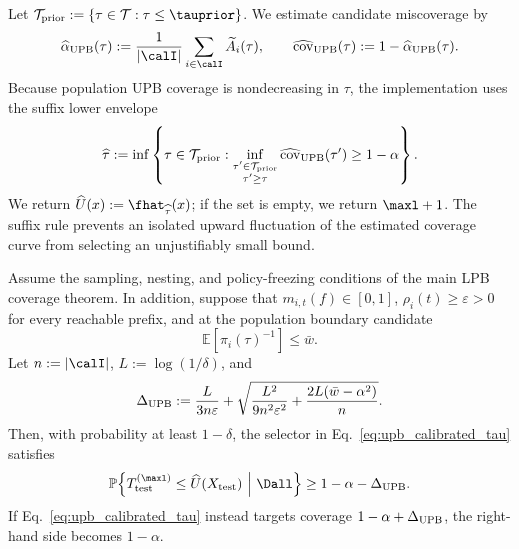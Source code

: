 Let \(\mathcal T_{\rm prior}:=\{\tau\in\mathcal T:\tau\leq\tauprior\}\).
We estimate candidate miscoverage by
\begin{equation}
    \widehat\alpha_{\rm UPB}(\tau)
    :=\frac{1}{|\calI|}\sum_{i\in\calI}\widetilde A_i(\tau),
    \qquad
    \widehat{\operatorname{cov}}_{\rm UPB}(\tau)
    :=1-\widehat\alpha_{\rm UPB}(\tau).
    \label{eq:upb_miscoverage_estimator}
\end{equation}
Because population UPB coverage is nondecreasing in \(\tau\), the
implementation uses the suffix lower envelope
\begin{equation}
    \widehat\tau
    :=\inf\left\{
        \tau\in\mathcal T_{\rm prior}:
        \inf_{\substack{\tau'\in\mathcal T_{\rm prior}\\\tau'\geq\tau}}
        \widehat{\operatorname{cov}}_{\rm UPB}(\tau')
        \geq1-\alpha
    \right\}.
    \label{eq:upb_calibrated_tau}
\end{equation}
We return \(\widehat U(x):=\fhat_{\widehat\tau}(x)\); if the set is empty,
we return \(\maxl+1\). The suffix rule prevents an isolated upward
fluctuation of the estimated coverage curve from selecting an unjustifiably
small bound.

\begin{theorem}
\label{thm:upb_coverage}
Assume the sampling, nesting, and policy-freezing conditions of the main LPB
coverage theorem. In addition, suppose that \(m_{i,t}(f)\in[0,1]\),
\(\rho_i(t)\geq\varepsilon>0\) for every reachable prefix, and at the
population boundary candidate
\begin{equation}
    \mathbb E\!\left[\pi_i(\tau)^{-1}\right]\leq\bar w.
\end{equation}
Let \(n:=|\calI|\), \(L:=\log(1/\delta)\), and
\begin{equation}
    \Delta_{\rm UPB}
    :=\frac{L}{3n\varepsilon}
      +\sqrt{
        \frac{L^2}{9n^2\varepsilon^2}
        +\frac{2L(\bar w-\alpha^2)}{n}}
    .
    \label{eq:upb_coverage_slack}
\end{equation}
Then, with probability at least \(1-\delta\), the selector in
Eq.~\eqref{eq:upb_calibrated_tau} satisfies
\begin{equation}
    \mathbb P\!\left\{
      T_{\rm test}^{(\maxl)}\leq\widehat U(X_{\rm test})
      \ \middle|\ \Dall
    \right\}
    \geq1-\alpha-\Delta_{\rm UPB}.
    \label{eq:upb_coverage_result}
\end{equation}
If Eq.~\eqref{eq:upb_calibrated_tau} instead targets coverage
\(1-\alpha+\Delta_{\rm UPB}\), the right-hand side becomes \(1-\alpha\).
\end{theorem}

